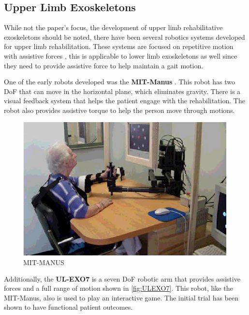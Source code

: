 \subsection{Upper Limb Exoskeletons}
While not the paper's focus,  the development of upper limb rehabilitative exoskeletons should be noted, there have been several robotics systems developed for upper limb rehabilitation. These systems are focused on repetitive motion with assistive forces \cite{rehmat2018upper} \cite{krebs2013rehabilitation}, this is applicable to lower limb exoskeletons as well since they need to provide assistive force to help maintain a gait motion. 

One of the early robots developed was the \textbf{MIT-Manus} \cite{krebs2004rehabilitation}. This robot has two DoF that can move in the horizontal plane, which eliminates gravity. There is a visual feedback system that helps the patient engage with the rehabilitation. The robot also provides assistive torque to help the person move through motions.    

\begin{figure}
    \centering
    \includegraphics[scale=0.5]{images/background/MIT-MANUS.png}
    \caption[MIT-MANUS]{MIT-MANUS \cite{MIT-Manus}}
    \label{fig:my_label}
\end{figure}


Additionally, the \textbf{UL-EXO7} is a seven DoF robotic arm that provides assistive forces and a full range of motion shown in \autoref{fig:ULEXO7}. This robot, like the MIT-Manus, also is used to play an interactive game. The initial trial has been shown to have functional patient outcomes. 

